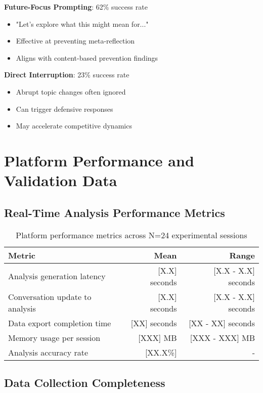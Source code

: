 \documentclass[11pt,letterpaper]{article}
\newcommand{\exponedataTotalSessionsRaw}{24}
\newcommand{\exponedataTotalSessions}{N=\exponedataTotalSessionsRaw}
\newcommand{\platformLatency}{[X.X]}
\newcommand{\platformMemoryUsage}{[XXX]}
\newcommand{\analysisAccuracy}{[XX.X\%]}
\begin{document}
\textbf{Future-Focus Prompting}: 62\% success rate
\begin{itemize}
    \item "Let's explore what this might mean for..."
    \item Effective at preventing meta-reflection
    \item Aligns with content-based prevention findings
\end{itemize}

\textbf{Direct Interruption}: 23\% success rate
\begin{itemize}
    \item Abrupt topic changes often ignored
    \item Can trigger defensive responses
    \item May accelerate competitive dynamics
\end{itemize}

\section{Platform Performance and Validation Data}
\label{app:performance}

\subsection{Real-Time Analysis Performance Metrics}

\begin{table}[h]
\centering
\begin{tabular}{lrr}
\toprule
\textbf{Metric} & \textbf{Mean} & \textbf{Range} \\
\midrule
Analysis generation latency & \platformLatency{} seconds & [X.X - X.X] seconds \\
Conversation update to analysis & \platformLatency{} seconds & [X.X - X.X] seconds \\
Data export completion time & [XX] seconds & [XX - XX] seconds \\
Memory usage per session & \platformMemoryUsage{} MB & [XXX - XXX] MB \\
Analysis accuracy rate & \analysisAccuracy{} & - \\
\bottomrule
\end{tabular}
\caption{Platform performance metrics across \exponedataTotalSessions{} experimental sessions}
\label{tab:performance_metrics}
\end{table}

\subsection{Data Collection Completeness}
\end{document}
